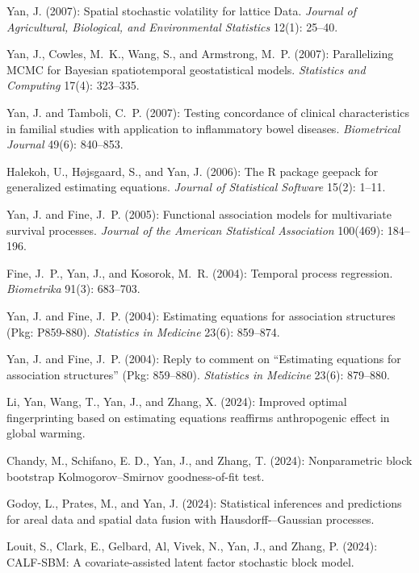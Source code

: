\documentclass[Statistics]{vita}
\begin{document}
\begin{vita}
\begin{Publications}
\begin{RefereedJournalArticles}
  \item Yan, J. (2007): Spatial stochastic volatility for lattice Data. \emph{Journal of Agricultural, Biological, and Environmental Statistics} 12(1): 25--40.
  \item Yan, J., Cowles, M.~K., Wang, S., and  Armstrong, M.~P. (2007): Parallelizing MCMC for Bayesian spatiotemporal geostatistical models. {\em Statistics and Computing\/} 17(4): 323--335.
  \item Yan, J. and Tamboli, C.~P. (2007): Testing concordance of clinical characteristics in familial studies with application to inflammatory bowel diseases. {\em Biometrical Journal\/} 49(6): 840--853.
  \item Halekoh, U., H\o{}jsgaard, S., and Yan, J. (2006): The {R} package geepack for generalized estimating equations. {\em Journal of Statistical Software\/} 15(2): 1--11.
  \item Yan, J. and Fine, J.~P. (2005): Functional association models for multivariate survival processes. {\em Journal of the American Statistical Association\/} 100(469): 184--196.
  \item Fine, J.~P., Yan, J., and Kosorok, M.~R. (2004): Temporal process regression. {\em Biometrika\/} 91(3): 683--703.
  \item Yan, J. and Fine, J.~P. (2004): Estimating equations for association structures ({P}kg: P859-880). {\em Statistics in Medicine\/} 23(6): 859--874.
  \item Yan, J. and Fine, J.~P. (2004): Reply to comment on ``Estimating equations for association structures'' ({P}kg: 859--880). {\em Statistics in Medicine\/} 23(6): 879--880.
  \end{RefereedJournalArticles}
  \begin{UnderReview}
  \item Li, Yan, Wang, T., Yan, J., and Zhang, X. (2024): Improved optimal fingerprinting based on estimating equations reaffirms anthropogenic effect in global warming.
  \item *Chandy, M., Schifano, E. D., Yan, J., and Zhang, T. (2024): Nonparametric block bootstrap Kolmogorov--Smirnov goodness-of-fit test.
  \item *Godoy, L., Prates, M., and Yan, J. (2024): Statistical inferences and predictions for areal data and spatial data fusion with Hausdorff-–Gaussian processes.
  \item *Louit, S., Clark, E., Gelbard, Al, Vivek, N., Yan, J., and Zhang, P. (2024): CALF-SBM: A covariate-assisted latent factor stochastic block model.

\end{UnderReview}
\end{Publications}
\end{vita}
\end{document}
